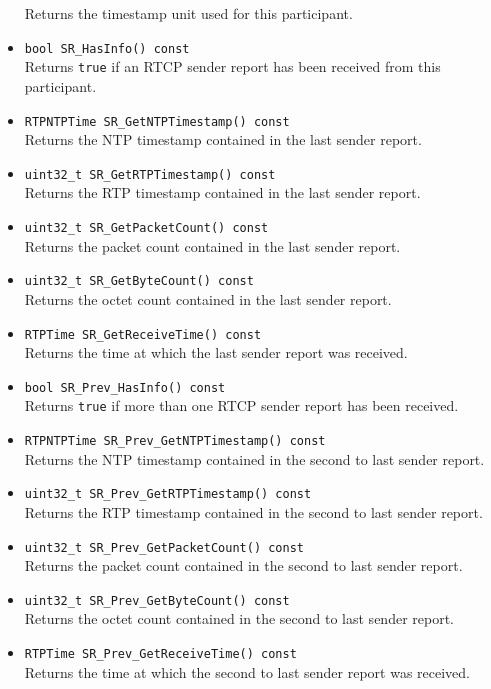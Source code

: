 \documentclass[12pt,a4paper]{article}
\begin{document}
\begin{itemize}
						Returns the timestamp unit used for this participant.
					\item {\tt bool SR\_HasInfo() const}\\
						Returns {\tt true} if an RTCP sender report has been received from this participant.
					\item {\tt RTPNTPTime SR\_GetNTPTimestamp() const}\\
						Returns the NTP timestamp contained in the last sender report.
					\item {\tt uint32\_t SR\_GetRTPTimestamp() const}\\
						Returns the RTP timestamp contained in the last sender report.
					\item {\tt uint32\_t SR\_GetPacketCount() const}\\
						Returns the packet count contained in the last sender report.
					\item {\tt uint32\_t SR\_GetByteCount() const}\\
						Returns the octet count contained in the last sender report.
					\item {\tt RTPTime SR\_GetReceiveTime() const}\\
						Returns the time at which the last sender report was received.
					\item {\tt bool SR\_Prev\_HasInfo() const}\\
						Returns {\tt true} if more than one RTCP sender report has been received.
					\item {\tt RTPNTPTime SR\_Prev\_GetNTPTimestamp() const}\\
						Returns the NTP timestamp contained in the second to last sender report.
					\item {\tt uint32\_t SR\_Prev\_GetRTPTimestamp() const}\\
						Returns the RTP timestamp contained in the second to last sender report.
					\item {\tt uint32\_t SR\_Prev\_GetPacketCount() const}\\
						Returns the packet count contained in the second to last sender report.
					\item {\tt uint32\_t SR\_Prev\_GetByteCount() const}\\
						Returns the octet count contained in the second to last sender report.
					\item {\tt RTPTime SR\_Prev\_GetReceiveTime() const}\\
						Returns the time at which the second to last sender report was received.

\end{itemize}
\end{document}

